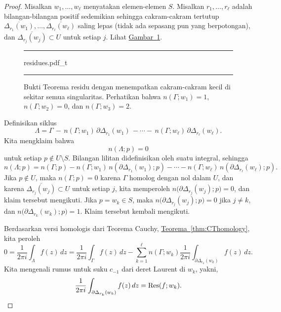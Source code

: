 \documentclass[12pt,openany]{book}
\theoremstyle{plain}
\theoremstyle{remark}
\theoremstyle{definition}
\newenvironment{myfig}{%
\begin{figure}[h!t]
\noindent\rule{\textwidth}{0.5pt}\vspace{12pt}\par\centering}%
{\par\noindent\rule{\textwidth}{0.5pt}
\end{figure}}
\theoremstyle{exercise}
\theoremstyle{example}
\newcommand{\figureref}[1]{\hyperref[#1]{Gambar~\ref*{#1}}}
\newcommand{\thmref}[1]{\hyperref[#1]{Teorema~\ref*{#1}}}
\begin{document}
\begin{proof}
Misalkan $w_1,\ldots,w_\ell$ menyatakan elemen-elemen $S$.
Misalkan $r_1,\ldots,r_\ell$ adalah bilangan-bilangan positif sedemikian sehingga
cakram-cakram tertutup
$\overline{\Delta_{r_1}(w_1)},\ldots, \overline{\Delta_{r_\ell}(w_\ell)}$
saling lepas (tidak ada sepasang pun yang berpotongan), dan
$\overline{\Delta_{r_j}(w_j)} \subset U$ untuk setiap $j$.
Lihat \figureref{fig:residues}.

\begin{myfig}
{residues.pdf_t}
\caption{Bukti Teorema residu dengan menempatkan cakram-cakram kecil di sekitar semua
singularitas. Perhatikan bahwa $n(\Gamma;w_1) = 1$, $n(\Gamma;w_2)=0$, dan
$n(\Gamma;w_3) = 2$.\label{fig:residues}}
\end{myfig}

Definisikan siklus
\begin{equation*}
\Lambda = \Gamma \,
- \, n(\Gamma;w_1) \, \partial \Delta_{r_1} (w_1)
\, -
\cdots
- \, n(\Gamma;w_\ell) \, \partial \Delta_{r_\ell} (w_\ell) .
\end{equation*}
Kita mengklaim bahwa
\begin{equation*}
n(\Lambda;p) = 0
\end{equation*}
untuk setiap $p \notin U \setminus S$.
Bilangan lilitan didefinisikan oleh suatu integral, sehingga
\begin{equation*}
n(\Lambda;p) = n(\Gamma;p)
- n(\Gamma;w_1) \, n(\partial \Delta_{r_1} (w_1) ; p)
-
\cdots
- n(\Gamma;w_\ell) \, n(\partial \Delta_{r_\ell} (w_\ell) ; p) .
\end{equation*}
Jika $p \notin U$, maka $n(\Gamma;p) = 0$ karena $\Gamma$ homolog dengan nol dalam
$U$,
dan karena
$\overline{\Delta_{r_j}(w_j)} \subset U$ untuk setiap $j$, kita memperoleh
$n\bigl( \partial \Delta_{r_j}(w_j) ; p\bigr) = 0$, dan klaim tersebut mengikuti.
Jika $p = w_k \in S$, maka
$n\bigl( \partial \Delta_{r_j}(w_j) ; p\bigr) = 0$ jika $j \neq k$,
dan
$n\bigl( \partial \Delta_{r_k}(w_k) ; p\bigr) = 1$.
Klaim tersebut kembali mengikuti.

Berdasarkan versi homologis dari Teorema Cauchy, \thmref{thm:CThomology}, kita peroleh
\begin{equation*}
0 =
\frac{1}{2 \pi i}
\int_\Lambda f(z) \, dz
=
\frac{1}{2 \pi i}
\int_\Gamma f(z) \, dz
-
\sum_{k=1}^\ell
n(\Gamma;w_k)
\frac{1}{2 \pi i}
\int_{\partial \Delta_{r_k}(w_k)} f(z) \, dz .
\end{equation*}
Kita mengenali rumus untuk suku $c_{-1}$ dari deret Laurent di
$w_k$, yakni,
\begin{equation*}
\frac{1}{2 \pi i}
\int_{\partial \Delta_{r_k}(w_k)} f(z) \, dz
= \operatorname{Res}(f;w_k) .  \qedhere
\end{equation*}
\end{proof}
\end{document}
